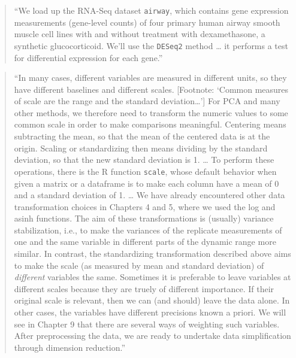 \documentclass[]{tufte-book}
\begin{document}
\begin{quote}
``We load up the RNA-Seq dataset \texttt{airway}, which contains gene expression
measurements (gene-level counts) of four primary human airway smooth muscle
cell lines with and without treatment with dexamethasone, a synthetic
glucocorticoid. We'll use the \texttt{DESeq2} method \ldots{} it performs a test
for differential expression for each gene.'' \citep{holmes2018modern}
\end{quote}

\begin{quote}
``In many cases, different variables are measured in different units, so they
have different baselines and different scales. {[}Footnote: `Common measures of
scale are the range and the standard deviation\ldots{}'{]} For PCA and many other
methods, we therefore need to transform the numeric values to some common scale
in order to make comparisons meaningful. Centering means subtracting the mean,
so that the mean of the centered data is at the origin. Scaling or standardizing
then means dividing by the standard deviation, so that the new standard
deviation is 1. \ldots{} To perform these operations, there is the R function
\texttt{scale}, whose default behavior when given a matrix or a dataframe is to make
each column have a mean of 0 and a standard deviation of 1. \ldots{} We have already
encountered other data transformation choices in Chapters 4 and 5, where we used
the log and asinh functions. The aim of these transformations is (usually)
variance stabilization, i.e., to make the variances of the replicate
measurements of one and the same variable in different parts of the dynamic
range more similar. In contrast, the standardizing transformation described
above aims to make the scale (as measured by mean and standard deviation) of
\emph{different} variables the same. Sometimes it is preferable to leave variables at
different scales because they are truely of different importance. If their
original scale is relevant, then we can (and should) leave the data alone. In
other cases, the variables have different precisions known a priori. We will see
in Chapter 9 that there are several ways of weighting such variables. After
preprocessing the data, we are ready to undertake data simplification through
dimension reduction.'' \citep{holmes2018modern}
\end{quote}
\end{document}
